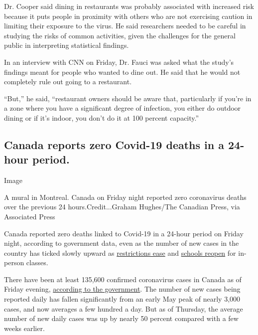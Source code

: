 Dr. Cooper said dining in restaurants was probably associated with
increased risk because it puts people in proximity with others who are
not exercising caution in limiting their exposure to the virus. He said
researchers needed to be careful in studying the risks of common
activities, given the challenges for the general public in interpreting
statistical findings.

In an interview with CNN on Friday, Dr. Fauci was asked what the study's
findings meant for people who wanted to dine out. He said that he would
not completely rule out going to a restaurant.

``But,'' he said, ``restaurant owners should be aware that, particularly
if you're in a zone where you have a significant degree of infection,
you either do outdoor dining or if it's indoor, you don't do it at 100
percent capacity.''

\hypertarget{canada-reports-zero-covid-19-deaths-in-a-24-hour-period}{%
\subsection{Canada reports zero Covid-19 deaths in a 24-hour
period.}\label{canada-reports-zero-covid-19-deaths-in-a-24-hour-period}}

Image

A mural in Montreal. Canada on Friday night reported zero coronavirus
deaths over the previous 24 hours.Credit...Graham Hughes/The Canadian
Press, via Associated Press

Canada reported zero deaths linked to Covid-19 in a 24-hour period on
Friday night, according to government data, even as the number of new
cases in the country has ticked slowly upward as
\href{https://www.nytimes3xbfgragh.onion/2020/06/26/world/canada/canada-reopens-but-little-returns-to-the-old-ways.html}{restrictions
ease} and
\href{https://www.nytimes3xbfgragh.onion/reuters/2020/09/03/us/03reuters-health-coronavirus-canada-education.html}{schools
reopen} for in-person classes.

There have been at least 135,600 confirmed coronavirus cases in Canada
as of Friday evening,
\href{https://www.nytimes3xbfgragh.onion/interactive/2020/world/canada/canada-coronavirus-cases.html}{according
to the government}. The number of new cases being reported daily has
fallen significantly from an early May peak of nearly 3,000 cases, and
now averages a few hundred a day. But as of Thursday, the average number
of new daily cases was up by nearly 50 percent compared with a few weeks
earlier.

